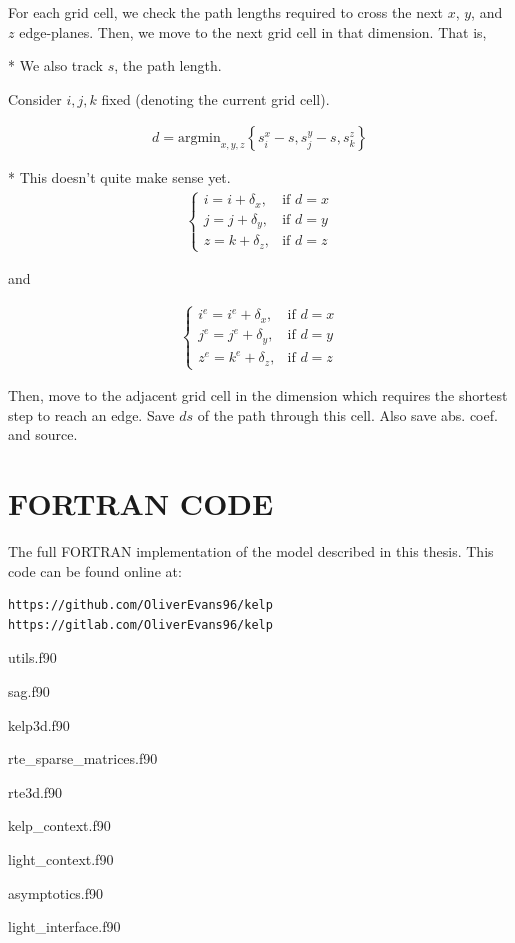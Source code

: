 \documentclass[ms,cpyr,lof,lot]{uathesis}
\begin{document}
For each grid cell, we check the path lengths required to cross the next $x$, $y$, and
$z$ edge-planes.
Then, we move to the next grid cell in that dimension.
That is,

* We also track $s$, the path length.

Consider $i,j,k$ fixed (denoting the current grid cell).

\begin{align}  
  d = \mbox{argmin}_{x,y,z} \left\{ s_i^x-s, s_j^y-s, s_k^z \right\}
\end{align}

* This doesn't quite make sense yet.
\begin{align}
  \begin{cases}
    i = i+\delta_x, & \mbox{if } d=x \\
    j = j+\delta_y, & \mbox{if } d=y \\
    z = k+\delta_z, & \mbox{if } d=z
  \end{cases}
\end{align}

and

\begin{align}
  \begin{cases}
    i^e = i^e+\delta_x, & \mbox{if } d=x \\
    j^e = j^e+\delta_y, & \mbox{if } d=y \\
    z^e = k^e+\delta_z, & \mbox{if } d=z
  \end{cases}
\end{align}


Then, move to the adjacent grid cell in the dimension which requires the shortest
step to reach an edge. Save $ds$ of the path through this cell. Also save abs.
coef. and source.
 \chapter{FORTRAN CODE}
\label{chap:fortran}

The full FORTRAN implementation of the model described in this thesis.
This code can be found online at:

\begin{verbatim}
https://github.com/OliverEvans96/kelp
https://gitlab.com/OliverEvans96/kelp
\end{verbatim}

utils.f90


sag.f90


kelp3d.f90


rte\_sparse\_matrices.f90


rte3d.f90


kelp\_context.f90


light\_context.f90


asymptotics.f90


light\_interface.f90


 
\end{document}

